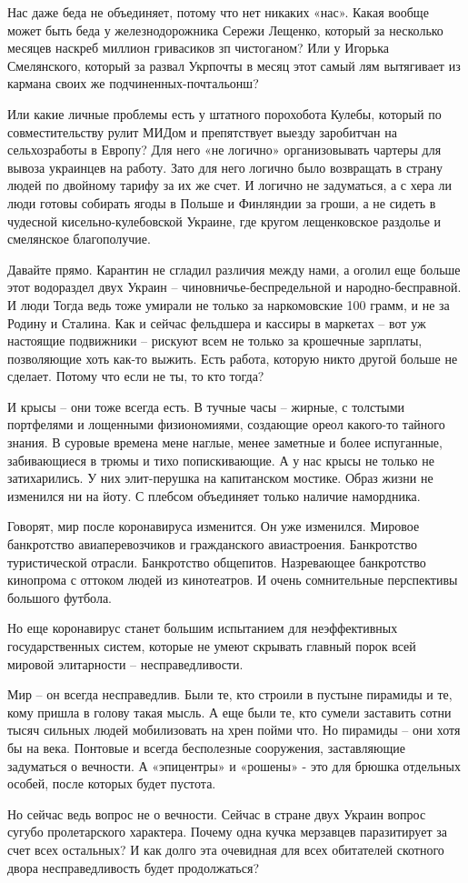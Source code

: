 Нас даже беда не объединяет, потому что нет никаких «нас». Какая вообще может
быть беда у железнодорожника Сережи Лещенко, который за несколько месяцев
наскреб миллион гривасиков зп чистоганом? Или у Игорька Смелянского, который за
развал Укрпочты в месяц этот самый лям вытягивает из кармана своих же
подчиненных-почтальонш?

Или какие личные проблемы есть у штатного порохобота Кулебы, который по
совместительству рулит МИДом и препятствует выезду заробитчан на сельхозработы
в Европу? Для него «не логично» организовывать чартеры для вывоза украинцев на
работу. Зато для него логично было возвращать в страну людей по двойному тарифу
за их же счет. И логично не задуматься, а с хера ли люди готовы собирать ягоды
в Польше и Финляндии за гроши, а не сидеть в чудесной кисельно-кулебовской
Украине, где кругом лещенковское раздолье и смелянское благополучие.

Давайте прямо. Карантин не сгладил различия между нами, а оголил еще больше
этот водораздел двух Украин – чиновничье-беспредельной и народно-бесправной. И
люди Тогда ведь тоже умирали не только за наркомовские 100 грамм, и не за
Родину и Сталина. Как и сейчас фельдшера и кассиры в маркетах – вот уж
настоящие подвижники – рискуют всем не только за крошечные зарплаты,
позволяющие хоть как-то выжить. Есть работа, которую никто другой больше не
сделает. Потому что если не ты, то кто тогда?

И крысы – они тоже всегда есть. В тучные часы – жирные, с толстыми портфелями и
лощенными физиономиями, создающие ореол какого-то тайного знания. В суровые
времена мене наглые, менее заметные и более испуганные, забивающиеся в трюмы и
тихо попискивающие. А у нас крысы не только не затихарились. У них элит-перушка
на капитанском мостике. Образ жизни не изменился ни на йоту. С плебсом
объединяет только наличие намордника.

Говорят, мир после коронавируса изменится. Он уже изменился. Мировое
банкротство авиаперевозчиков и гражданского авиастроения. Банкротство
туристической отрасли. Банкротство общепитов. Назревающее банкротство кинопрома
с оттоком людей из кинотеатров. И очень сомнительные перспективы большого
футбола.

Но еще коронавирус станет большим испытанием для неэффективных государственных
систем, которые не умеют скрывать главный порок всей мировой элитарности –
несправедливости.

Мир – он всегда несправедлив. Были те, кто строили в пустыне пирамиды и те,
кому пришла в голову такая мысль. А еще были те, кто сумели заставить сотни
тысяч сильных людей мобилизовать на хрен пойми что. Но пирамиды – они хотя бы
на века. Понтовые и всегда бесполезные сооружения, заставляющие задуматься о
вечности. А «эпицентры» и «рошены» - это для брюшка отдельных особей, после
которых будет пустота.

Но сейчас ведь вопрос не о вечности. Сейчас в стране двух Украин вопрос сугубо
пролетарского характера. Почему одна кучка мерзавцев паразитирует за счет всех
остальных? И как долго эта очевидная для всех обитателей скотного двора
несправедливость будет продолжаться?
